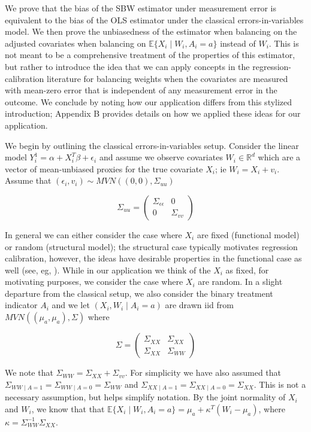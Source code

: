 \documentclass[12pt]{article}
\begin{document}
We prove that the bias of the SBW estimator under measurement error is equivalent to the bias of the OLS estimator under the classical errors-in-variables model. We then prove the unbiasedness of the estimator when balancing on the adjusted covariates when balancing on $\mathbb{E}\{X_i \mid W_i, A_i = a\}$ instead of $W_i$. This is not meant to be a comprehensive treatment of the properties of this estimator, but rather to introduce the idea that we can apply concepts in the regression-calibration literature for balancing weights when the covariates are measured with mean-zero error that is independent of any measurement error in the outcome. We conclude by noting how our application differs from this stylized introduction; Appendix B provides details on how we applied these ideas for our application.

We begin by outlining the classical errors-in-variables setup. Consider the linear model $Y_i^1 = \alpha + X_i^T\beta + \epsilon_i$ and assume we observe covariates $W_i \in \mathbb{R}^d$ which are a vector of mean-unbiased proxies for the true covariate $X_i$; ie $W_i = X_i + v_i$. Assume that $(\epsilon_i, v_i) \sim MVN((0,0), \Sigma_{uu})$ 

$$
\Sigma_{uu} = \begin{pmatrix} 
\Sigma_{\epsilon\epsilon} & 0 \\ 
0 & \Sigma_{vv} 
\end{pmatrix}
$$ 

In general we can either consider the case where $X_i$ are fixed (functional model) or random (structural model); the structural case typically motivates regression calibration, however, the ideas have desirable properties in the functional case as well (see, eg, \cite{gleser1992importance}). While in our application we think of the $X_i$ as fixed, for motivating purposes, we consider the case where $X_i$ are random. In a slight departure from the classical setup, we also consider the binary treatment indicator $A_i$ and we let $(X_i, W_i \mid A_i = a)$ are drawn iid from $MVN((\mu_a, \mu_a), \Sigma)$ where 

$$
\Sigma = \begin{pmatrix} 
\Sigma_{XX} & \Sigma_{XX} \\ 
\Sigma_{XX} & \Sigma_{WW}  
\end{pmatrix}
$$ 

We note that $\Sigma_{WW} = \Sigma_{XX} + \Sigma_{vv}$. For simplicity we have also assumed that $\Sigma_{WW \mid A = 1} = \Sigma_{WW \mid A = 0} = \Sigma_{WW}$ and $\Sigma_{XX \mid A = 1} = \Sigma_{XX \mid A = 0} = \Sigma_{XX}$. This is not a necessary assumption, but helps simplify notation. By the joint normality of $X_i$ and $W_i$, we know that that $\mathbb{E}\{X_i \mid W_i, A_i = a\} = \mu_a + \kappa^T(W_i - \mu_a)$, where $\kappa = \Sigma_{WW}^{-1}\Sigma_{XX}$.
\end{document}
